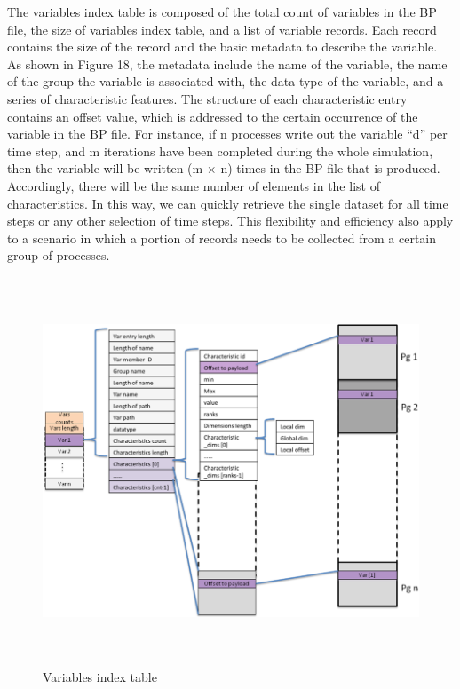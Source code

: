 The variables index table is composed of the total count of variables in the BP 
file, the size of variables index table, and a list of variable records. Each record 
contains the size of the record and the basic metadata to describe the variable. 
As shown in Figure 18, the metadata include the name of the variable, the name 
of the group the variable is associated with, the data type of the variable, and 
a series of characteristic features. The structure of each characteristic entry 
contains an offset value, which is addressed to the certain occurrence of the variable 
in the BP file. For instance, if n processes write out the variable ``d'' per time 
step, and m iterations have been completed during the whole simulation, then the 
variable will be written (m\textit{ }\ensuremath{\times} n) times in the BP file 
that is produced. Accordingly, there will be the same number of elements in the 
list of characteristics. In this way, we can quickly retrieve the single dataset 
for all time steps or any other selection of time steps. This flexibility and efficiency 
also apply to a scenario in which a portion of records needs to be collected from 
a certain group of processes. 

\begin{figure}[htbp]
\begin{center}
\includegraphics[width=420pt, height=327pt]{ADIOS-Manual-fig031.png}
\caption{Variables index table}
\end{center}
\end{figure}\label{HRef119578880}\label{HToc144350177}

